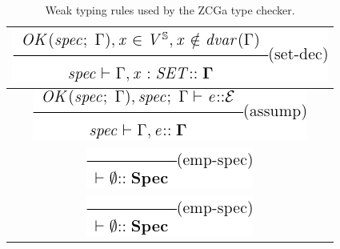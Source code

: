 \begin{table}
\begin{tabular}{|c|}
        \hline
        \includegraphics[scale=0.7]{Figures/zcga/7.png} \\
        \hline
        \includegraphics[scale=0.7]{Figures/zcga/8.png} \\
        \hline
        \includegraphics[scale=0.7]{Figures/zcga/9.png} \\
        \hline
        \includegraphics[scale=0.7]{Figures/zcga/10.png} \\
        \hline
    \end{tabular}
    \caption{Weak typing rules used by the ZCGa type checker. \label{tab:wttrules}}
\end{table}




